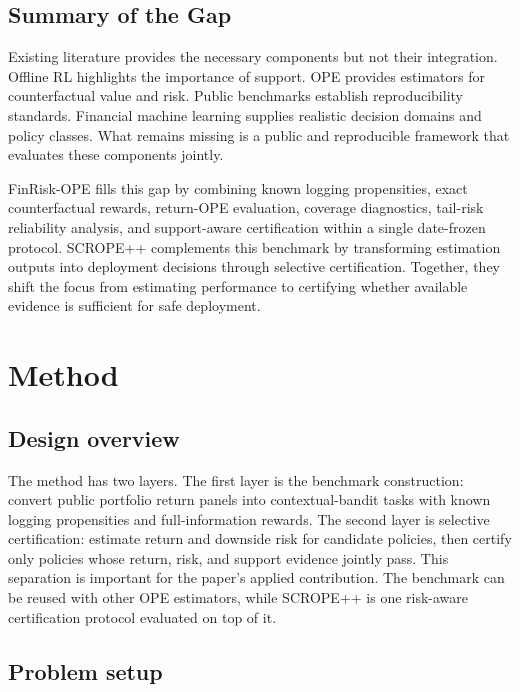 \documentclass[conference]{IEEEtran}
\begin{document}
\subsection{Summary of the Gap}

Existing literature provides the necessary components but not their integration. Offline RL highlights the importance of support. OPE provides estimators for counterfactual value and risk. Public benchmarks establish reproducibility standards. Financial machine learning supplies realistic decision domains and policy classes. What remains missing is a public and reproducible framework that evaluates these components jointly.

FinRisk-OPE fills this gap by combining known logging propensities, exact counterfactual rewards, return-OPE evaluation, coverage diagnostics, tail-risk reliability analysis, and support-aware certification within a single date-frozen protocol. SCROPE++ complements this benchmark by transforming estimation outputs into deployment decisions through selective certification. Together, they shift the focus from estimating performance to certifying whether available evidence is sufficient for safe deployment.

\section{Method}

\subsection{Design overview}

The method has two layers. The first layer is the benchmark construction: convert public portfolio return panels into contextual-bandit tasks with known logging propensities and full-information rewards. The second layer is selective certification: estimate return and downside risk for candidate policies, then certify only policies whose return, risk, and support evidence jointly pass. This separation is important for the paper's applied contribution. The benchmark can be reused with other OPE estimators, while SCROPE++ is one risk-aware certification protocol evaluated on top of it.

\subsection{Problem setup}
\end{document}
